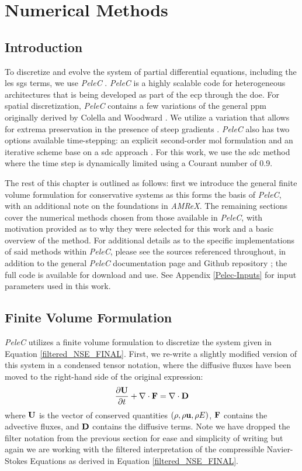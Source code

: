 \chapter{Numerical Methods}
\section{Introduction}
To discretize and evolve the system of partial differential equations, including the \gls{les} \gls{sgs} terms, we use \textit{PeleC} \cite{PeleC1, PeleC2}. \textit{PeleC} is a highly scalable code for heterogeneous architectures that is being developed as part of the \gls{ecp} through the \gls{doe}. For spatial discretization, \textit{PeleC} contains a few variations of the general \gls{ppm} originally derived by Colella and Woodward \cite{1984JCoPPPM}. We utilize a variation that allows for extrema preservation in the presence of steep gradients \cite{MILLER200226, COLELLA20087069}. \textit{PeleC} also has two options available time-stepping: an explicit second-order \gls{mol} formulation and an iterative scheme base on a \gls{sdc} approach \cite{SDC_PeleC}. For this work, we use the \gls{sdc} method where the time step is dynamically limited using a Courant number of 0.9. 

The rest of this chapter is outlined as follows: first we introduce the general finite volume formulation for conservative systems as this forms the basis of \textit{PeleC}, with an additional note on the foundations in \textit{AMReX}. The remaining sections cover the numerical methods chosen from those available in \textit{PeleC}, with motivation provided as to why they were selected for this work and a basic overview of the method. For additional details as to the specific implementations of said methods within \textit{PeleC}, please see the sources referenced throughout, in addition to the general \textit{PeleC} documentation page \cite{} and Github repository \cite{}; the full code is available for download and use. See Appendix \ref{Pelec-Inputs} for input parameters used in this work.  

\section{Finite Volume Formulation} \label{FVM_section}
\textit{PeleC} utilizes a finite volume formulation \cite{} to discretize the system given in Equation \ref{filtered_NSE_FINAL}. First, we re-write a slightly modified version of this system in a condensed tensor notation, where the diffusive fluxes have been moved to the right-hand side of the original expression: 
\begin{equation} \label{NSE_tensor}
\dfrac{\partial \vb{U}}{\partial t} + \nabla \cdot \vb{F} = \nabla \cdot \vb{D}
\end{equation}
where $\vb{U}$ is the vector of conserved quantities $(\rho, \rho \vb{u}, \rho E)$, $\vb{F}$ contains the advective fluxes, and $\vb{D}$ contains the diffusive terms. Note we have dropped the filter notation from the previous section for ease and simplicity of writing but again we are working with the filtered interpretation of the compressible Navier-Stokes Equations as derived in Equation \ref{filtered_NSE_FINAL}. 

